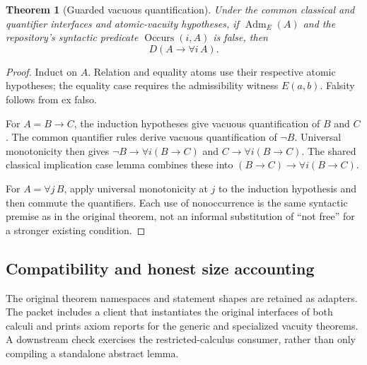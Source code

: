\documentclass[11pt,letterpaper]{article}
\newcommand{\code}[1]{\texttt{\small\detokenize{#1}}}
\newtheorem{theorem}{Theorem}[section]
\theoremstyle{definition}\newtheorem{definition}[theorem]{Definition}
\begin{document}
\begin{theorem}[Guarded vacuous quantification]
Under the common classical and quantifier interfaces and atomic-vacuity
hypotheses, if \(\operatorname{Adm}_E(A)\) and the repository's syntactic
predicate \(\operatorname{Occurs}(i,A)\) is false, then
\[
                   D(A\to\forall i\,A).
\]
\end{theorem}
\begin{proof}
Induct on \(A\). Relation and equality atoms use their respective atomic
hypotheses; the equality case requires the admissibility witness \(E(a,b)\).
Falsity follows from ex falso.

For \(A=B\to C\), the induction hypotheses give vacuous quantification of
\(B\) and \(C\). The common quantifier rules derive vacuous quantification
of \(\neg B\). Universal monotonicity then gives
\(\neg B\to\forall i(B\to C)\) and
\(C\to\forall i(B\to C)\). The shared classical implication case lemma
combines these into \((B\to C)\to\forall i(B\to C)\).

For \(A=\forall j\,B\), apply universal monotonicity at \(j\) to the
induction hypothesis and then commute the quantifiers. Each use of nonoccurrence
is the same syntactic premise as in the original theorem, not an informal
substitution of ``not free'' for a stronger existing condition.
\end{proof}

\subsection{Compatibility and honest size accounting}

The original theorem namespaces and statement shapes are retained as adapters.
The packet includes a client that instantiates the original interfaces of both
calculi and prints axiom reports for the generic and specialized vacuity
theorems. A downstream \code{KEind222} check exercises the restricted-calculus
consumer, rather than only compiling a standalone abstract lemma.
\end{document}
